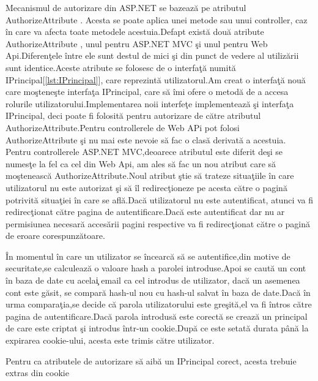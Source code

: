 \documentclass[a4paper,12pt]{report}
\let\oldref\ref
\renewcommand{\ref}[1]{[\oldref{#1}]}
\begin{document}
Mecanismul de autorizare din ASP.NET se bazeaz\u a pe atributul AuthorizeAttribute . Acesta se poate aplica unei metode
sau unui controller, caz \^in care va afecta toate metodele acestuia.Defapt exist\u a dou\u a atribute AuthorizeAttribute ,
unul pentru ASP.NET MVC \c si unul pentru Web Api.Diferen\c tele \^intre ele sunt destul de mici \c si din punct de vedere al utiliz\u arii
sunt identice.Aceste atribute se folosesc de o interfa\c t\u a numit\u a IPrincipal\ref{lst:IPrincipal}, care reprezint\u a utilizatorul.Am creat o interfa\c t\u a nou\u a care mo\c stene\c ste 
interfa\c ta IPrincipal, care s\u a \^imi ofere o metod\u a de a accesa rolurile utilizatorului.Implementarea noii interfe\c te implementeaz\u a
\c si interfa\c ta IPrincipal, deci poate fi folosit\u a pentru autorizare de c\u atre atributul AuthorizeAttribute.Pentru 
controllerele de Web APi pot folosi AuthorizeAttribute  \c si nu mai este nevoie s\u a fac o clas\u a derivat\u a a acestuia.
Pentru controllerele ASP.NET MVC,deoarece atributul este diferit de\c si se numes\c te la fel ca cel din Web Api, am ales s\u a
fac un nou atribut care s\u a mo\c steneasc\u a AuthorizeAttribute.Noul atribut \c stie s\u a trateze situa\c tiile 
\^in care utilizatorul nu este autorizat \c si s\u a \^il redirec\c tioneze pe acesta c\u atre o pagin\u a potrivit\u a situa\c tiei \^in 
care se afl\u a.Dac\u a utilizatorul nu este autentificat, atunci va fi redirec\c tionat c\u atre pagina de autentificare.Dac\u a 
este autentificat dar nu ar permisiunea necesar\u a acces\u arii pagini respective va fi redirec\c tionat c\u atre o pagin\u a de eroare 
corespunz\u atoare.

\^In momentul \^in care un utilizator se \^incearc\u a s\u a se autentifice,din motive de securitate,se calculeaz\u a o valoare hash a parolei
introduse.Apoi se caut\u a un cont \^in baza de date cu acela\c i email ca cel introdus de utilizator, dac\u a un asemenea cont este g\u asit,
se compar\u a hash-ul nou cu hash-ul salvat \^in baza de date.Dac\u a \^in urma compara\c tia,se decide c\u a parola utilizatorului este gre\c sit\u a,el
va fi \^intros c\u atre pagina de autentificare.Dac\u a parola introdus\u a este corect\u a se creaz\u a un principal de care este criptat \c si 
introdus \^intr-un cookie.Dup\u a ce este setat\u a durata p\^an\u a la expirarea cookie-ului, acesta este trimis c\u atre utilizator.

Pentru ca atributele de autorizare s\u a aib\u a un IPrincipal corect, acesta trebuie extras din cookie
\end{document}
